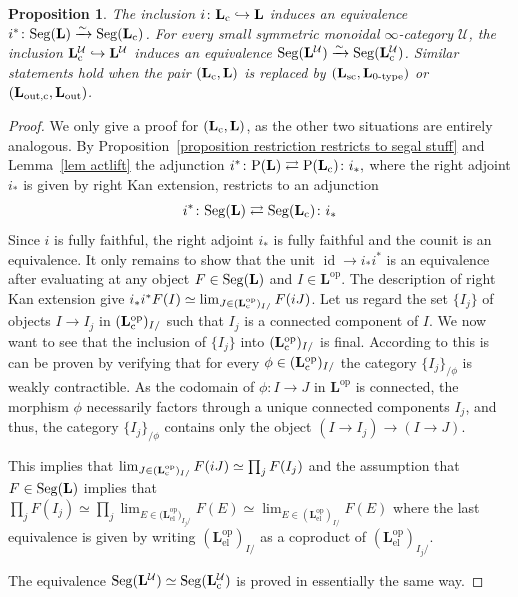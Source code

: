 \documentclass{amsart}
\numberwithin{theorem}{subsection}
\newtheorem{proposition}[theorem]{Proposition}
\theoremstyle{definition}
\providecommand{\op}{\mathrm{op}}
\providecommand{\xel}{\mathrm{el}}
\newcommand{\xU}{\mathcal{U}}
\newcommand{\id}{\operatorname{id}}
\newcommand{\Pre}{\name{P}}
\newcommand{\isoto}{\xrightarrow{\sim}}
\newcommand{\name}[1]{\ensuremath{\text{\textup{#1}}}}
\newcommand{\levelg}{\mathbf{L}}
\newcommand{\levelU}{\levelg^\xU}
\newcommand{\levelgconn}{\levelg_{\name{c}}}
\newcommand{\levelcU}{\levelgconn^{\xU}}
\newcommand{\Seg}{\name{Seg}}
\begin{document}
\begin{proposition}\label{proposition LcL}
The inclusion $i\colon\levelgconn \hookrightarrow \levelg$  induces an equivalence $i^*\colon \Seg(\levelg)\isoto\Seg(\levelgconn)$. 
For every small symmetric monoidal $\infty$-category $\xU$, the inclusion $\levelcU \hookrightarrow \levelU$ induces an equivalence $\Seg(\levelU)\isoto\Seg(\levelcU)$.
Similar statements hold when the pair $(\levelgconn, \levelg)$ is replaced by $(\levelg_{\name{sc}},\levelg_{\name{0-type}})$ or $(\levelg_{\name{out,c}},\levelg_{\name{out}})$.
\end{proposition}
\begin{proof}
We only give a proof for $(\levelgconn, \levelg)$, as the other two situations are entirely analogous. 
By Proposition~\ref{proposition restriction restricts to segal stuff} and Lemma~\ref{lem actlift} the adjunction
$i^*\colon \Pre(\levelg)\rightleftarrows \Pre(\levelgconn)\colon i_*,$ where the right adjoint $i_*$ is given by right Kan extension, restricts to an adjunction
\[i^*\colon \Seg(\levelg)\rightleftarrows \Seg(\levelgconn)\colon i_*\]
Since $i$ is fully faithful, the right adjoint $i_*$ is fully faithful and the counit is an equivalence. It only remains to show that the unit $\id \to i_*i^*$ is an equivalence after evaluating at any object $F\in \Seg(\levelg)$ and $I\in \levelg^\op$. 
The description of right Kan extension give $i_*i^*F(I)\simeq \lim_{J\in (\levelgconn^\op)_{I/}}F(iJ)$. Let us regard the set $\{I_j\}$ of objects $I\to I_j$ in $(\levelgconn^\op)_{I/}$ such that $I_j$ is a connected component of $I$. 
We now want to see that the inclusion of $\{I_j\}$ into $(\levelgconn^\op)_{I/}$ is final. 
According to \cite[Theorem 4.1.3.1]{ht} this is can be proven by verifying that for every $\phi\in (\levelgconn^\op)_{I/}$ the category $\{I_j\}_{/\phi}$ is weakly contractible. 
As the codomain of $\phi\colon I\to J$ in $\levelg^\op$ is connected, the morphism $\phi$ necessarily factors through a unique connected components $I_j$, and thus, the category $\{I_j\}_{/\phi}$ contains only the object $(I \to I_j) \to (I \to J)$.

This implies that $\lim_{J\in (\levelgconn^\op)_{I/}}F(iJ)\simeq \prod_{j}F(I_j)$ and the assumption that $F\in \Seg(\levelg)$ implies that $\prod_{j}F(I_j)\simeq \prod_{j}\lim_{E\in {(\levelg_{\xel}^\op})_{I_j/}}F(E)\simeq \lim_{E\in{(\levelg_{\xel}^\op)}_{I/}}F(E)$ where the last equivalence is given by writing ${(\levelg_{\xel}^\op)}_{I/}$ as a coproduct of ${(\levelg_{\xel}^\op)}_{I_j/}$.

The equivalence $\Seg(\levelU)\simeq \Seg(\levelcU)$ is proved in essentially the same way.
\end{proof}
\end{document}
